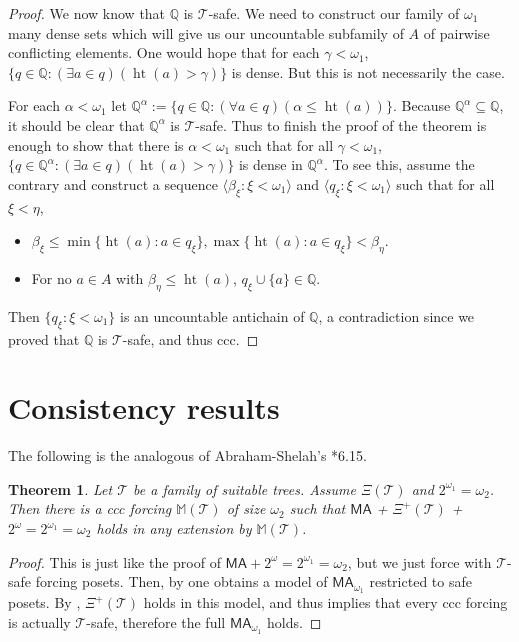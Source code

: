 \documentclass[a4paper,noamsfonts]{amsart}
\newtheorem{theorem}{Theorem}[section]
\theoremstyle{definition}
\newcommand{\Q}{\mathbb{Q}}
\newcommand{\seb}{\subseteq}
\newcommand{\tup}[1]{\langle#1\rangle}
\newcommand{\MA}{\textsf{MA}}
\newcommand{\1}{\mathbf{1}}
\newcommand{\M}{\mathbb{M}}
\newcommand{\T}{\mathcal{T}}
\newcommand{\prop}{\Xi}
\newcommand{\propp}{\prop^{+}}
\DeclareMathOperator{\hht}{ht}
\begin{document}
\begin{proof}
  We now know that $\Q$ is $\T$-safe. We need to construct
  our family of $\omega_{1}$ many dense sets which will give us
  our uncountable subfamily of $A$ of pairwise conflicting elements.
  One would hope that
  for each $\gamma < \omega_{1}$,
  $\{q \in \Q : (\exists a \in q)(\hht(a) > \gamma)\}$ is dense. But this
  is not necessarily the case.

  For each $\alpha < \omega_{1}$ let
  $\Q^{\alpha} := \{q \in \Q : (\forall a \in q)(\alpha \le \hht(a))\}$.
  Because $\Q^{\alpha} \seb \Q$, it should be clear that $\Q^{\alpha}$
  is $\T$-safe. Thus to finish the proof of the theorem
  is enough to show that there is $\alpha < \omega_{1}$ such that
  for all $\gamma < \omega_{1}$,
  $\{q \in \Q^{\alpha} : (\exists a \in q)(\hht(a) > \gamma)\}$
  is dense in $\Q^{\alpha}$. To see this, assume the contrary
  and construct
  a sequence $\tup{\beta_{\xi} : \xi < \omega_{1}}$ and
  $\tup{q_{\xi} : \xi < \omega_{1}}$ such that for all $\xi < \eta$,
  \begin{itemize}
    \item $\beta_{\xi} \le \min\{\hht(a) : a \in q_{\xi}\},
    \max \{\hht(a) : a \in q_{\xi}\} < \beta_{\eta}$.
    \item For no $a \in A$ with $\beta_{\eta} \le \hht(a)$,
    $q_{\xi} \cup \{a\} \in \Q$. 
  \end{itemize}
  Then $\{q_{\xi} : \xi < \omega_{1}\}$ is an uncountable antichain
  of $\Q$, a contradiction since we proved that $\Q$ is $\T$-safe,
  and thus ccc.
\end{proof}

\section{Consistency results}

The following is the analogous of Abraham-Shelah's \cite{ShelahAbraham}*{6.15}.

\begin{theorem}\label{thm:ma+psi}
  Let $\T$ be a family of suitable trees. Assume
  $\prop(\T)$ and $2^{\omega_{1}} = \omega_{2}$.
  Then
  there is a ccc forcing $\M(\T)$ of size $\omega_{2}$
  such that
  $\MA$ + $\propp(\T)$ + $2^{\omega} = 2^{\omega_{1}} = \omega_{2}$
  holds in any extension by
  $\M(\T)$.
\end{theorem}
\begin{proof}
  This is just like the proof of $\MA + 2^{\omega} = 2^{\omega_{1}} = \omega_{2}$,
  but we just force with $\T$-safe forcing posets. Then, by
  one obtains a model
  of $\MA_{\omega_{1}}$ restricted to safe posets. By ,
  $\propp(\T)$ holds in this model,
  and thus  implies that every
  ccc forcing is actually $\T$-safe, therefore the full
  $\MA_{\omega_{1}}$ holds.
\end{proof}
\end{document}
